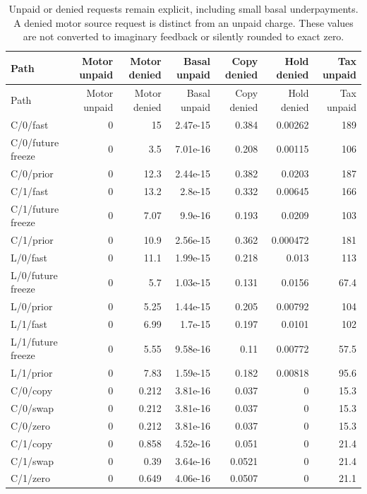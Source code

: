 \begin{longtable}{lrrrrrr}
\caption{Unpaid or denied requests remain explicit, including small basal underpayments. A denied motor source request is distinct from an unpaid charge. These values are not converted to imaginary feedback or silently rounded to exact zero.}\label{tab:young-unpaid}\\
\toprule
Path & Motor unpaid & Motor denied & Basal unpaid & Copy denied & Hold denied & Tax unpaid \\
\midrule\endfirsthead
\toprule
Path & Motor unpaid & Motor denied & Basal unpaid & Copy denied & Hold denied & Tax unpaid \\
\midrule\endhead
C/0/fast & 0 & 15 & 2.47e-15 & 0.384 & 0.00262 & 189 \\
C/0/future freeze & 0 & 3.5 & 7.01e-16 & 0.208 & 0.00115 & 106 \\
C/0/prior & 0 & 12.3 & 2.44e-15 & 0.382 & 0.0203 & 187 \\
C/1/fast & 0 & 13.2 & 2.8e-15 & 0.332 & 0.00645 & 166 \\
C/1/future freeze & 0 & 7.07 & 9.9e-16 & 0.193 & 0.0209 & 103 \\
C/1/prior & 0 & 10.9 & 2.56e-15 & 0.362 & 0.000472 & 181 \\
L/0/fast & 0 & 11.1 & 1.99e-15 & 0.218 & 0.013 & 113 \\
L/0/future freeze & 0 & 5.7 & 1.03e-15 & 0.131 & 0.0156 & 67.4 \\
L/0/prior & 0 & 5.25 & 1.44e-15 & 0.205 & 0.00792 & 104 \\
L/1/fast & 0 & 6.99 & 1.7e-15 & 0.197 & 0.0101 & 102 \\
L/1/future freeze & 0 & 5.55 & 9.58e-16 & 0.11 & 0.00772 & 57.5 \\
L/1/prior & 0 & 7.83 & 1.59e-15 & 0.182 & 0.00818 & 95.6 \\
C/0/copy & 0 & 0.212 & 3.81e-16 & 0.037 & 0 & 15.3 \\
C/0/swap & 0 & 0.212 & 3.81e-16 & 0.037 & 0 & 15.3 \\
C/0/zero & 0 & 0.212 & 3.81e-16 & 0.037 & 0 & 15.3 \\
C/1/copy & 0 & 0.858 & 4.52e-16 & 0.051 & 0 & 21.4 \\
C/1/swap & 0 & 0.39 & 3.64e-16 & 0.0521 & 0 & 21.4 \\
C/1/zero & 0 & 0.649 & 4.06e-16 & 0.0507 & 0 & 21.1 \\
\bottomrule
\end{longtable}

